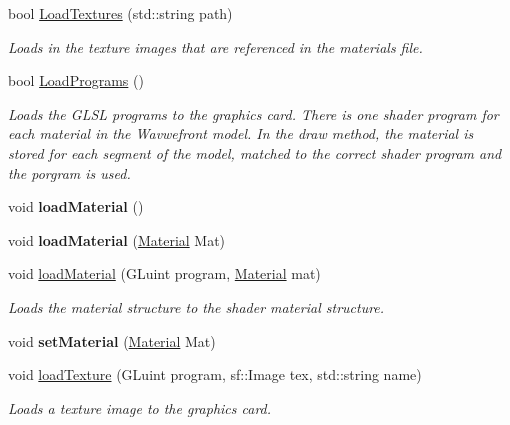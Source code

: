 \begin{DoxyCompactItemize}
bool \hyperlink{class_obj_model_a209faf29a9d9a22793c9d599df492350}{Load\+Textures} (std\+::string path)
\begin{DoxyCompactList}\small\item\em Loads in the texture images that are referenced in the materials file. \end{DoxyCompactList}\item 
\mbox{\label{class_obj_model_a75ee68d8cbae0563c0f8c66a98a66904}} 
bool \hyperlink{class_obj_model_a75ee68d8cbae0563c0f8c66a98a66904}{Load\+Programs} ()
\begin{DoxyCompactList}\small\item\em Loads the G\+L\+SL programs to the graphics card. There is one shader program for each material in the Wavwefront model. In the draw method, the material is stored for each segment of the model, matched to the correct shader program and the porgram is used. \end{DoxyCompactList}\item 
\mbox{\label{class_obj_model_a05d65d3b5fbc7a45468f741221154718}} 
void {\bfseries load\+Material} ()
\item 
\mbox{\label{class_obj_model_a3db5915c97763cb64d6bcea84dc96578}} 
void {\bfseries load\+Material} (\hyperlink{class_material}{Material} Mat)
\item 
void \hyperlink{class_obj_model_adda1040ead23e4a616c4068063f25598}{load\+Material} (G\+Luint program, \hyperlink{class_material}{Material} mat)
\begin{DoxyCompactList}\small\item\em Loads the material structure to the shader material structure. \end{DoxyCompactList}\item 
\mbox{\label{class_obj_model_a44fb873d0cb0d0bb862f5a5ec3b91d7d}} 
void {\bfseries set\+Material} (\hyperlink{class_material}{Material} Mat)
\item 
void \hyperlink{class_obj_model_af7149df564ffbaa22bded4ba201431c7}{load\+Texture} (G\+Luint program, sf\+::\+Image tex, std\+::string name)
\begin{DoxyCompactList}\small\item\em Loads a texture image to the graphics card. \end{DoxyCompactList}\item 

\end{DoxyCompactItemize}
